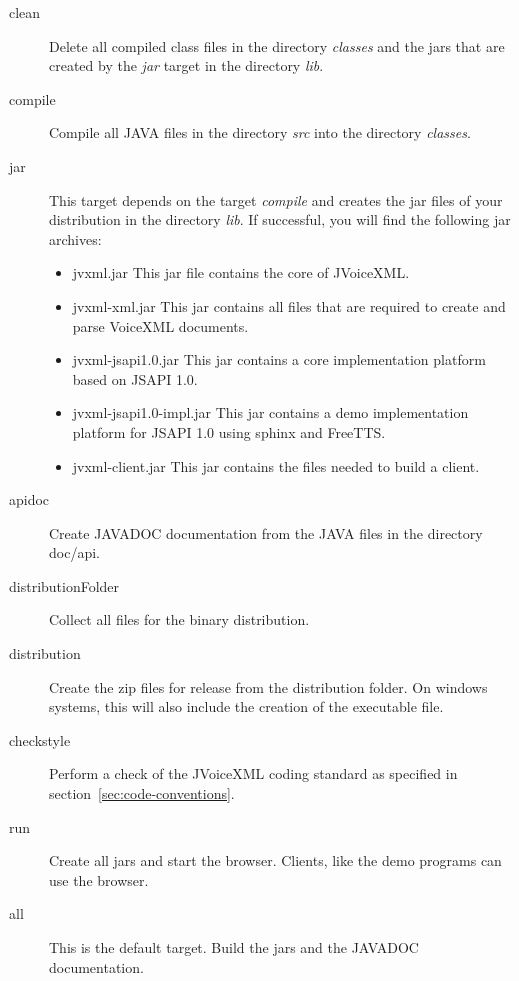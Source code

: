 \documentclass[11pt,a4paper]{article}
\begin{document}
\begin{description}
\item[clean]
Delete all compiled class files in the directory \emph{classes}
and the jars that are created by the \emph{jar} target in the directory 
\emph{lib}.

\item[compile]
 Compile all JAVA files in the directory \emph{src} into the directory
\emph{classes}.

\item[jar]
 This target depends on the target \emph{compile} and creates the jar
files of your distribution in the directory \emph{lib}.
If successful, you will find the following jar archives:
\begin{itemize}
\item jvxml.jar This jar file contains the core of JVoiceXML.
\item jvxml-xml.jar This jar contains all files that are required
to create and parse VoiceXML documents.
\item jvxml-jsapi1.0.jar This jar contains a core implementation platform
based on JSAPI 1.0.
\item jvxml-jsapi1.0-impl.jar This jar contains a demo implementation
platform for JSAPI 1.0 using sphinx and FreeTTS.
\item jvxml-client.jar This jar contains the files needed to build
a client.
\end{itemize}

\item[apidoc]
Create JAVADOC documentation from the JAVA files in the directory
doc/api.

\item[distributionFolder]
Collect all files for the binary distribution.

\item[distribution]
Create the zip files for release from the distribution folder.
On windows systems, this will also include the creation of
the executable file.

\item[checkstyle]
Perform a check of the JVoiceXML coding standard as specified 
in section~\ref{sec:code-conventions}.

\item[run]
Create all jars and start the browser. Clients, like the demo
programs can use the browser.

\item[all]
This is the default target. Build the jars and the JAVADOC
documentation.

\end{description}
\end{document}
